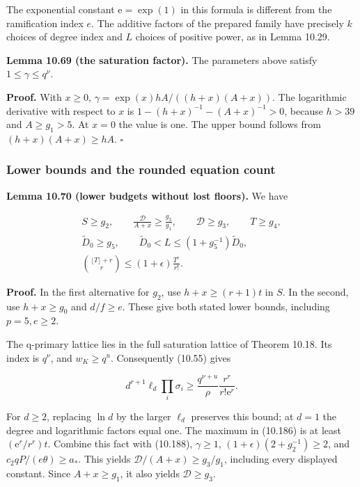 \documentclass[
  11pt,
  a4paper,
]{article}
\begin{document}
The exponential constant \(\mathrm e=\exp(1)\) in this formula is
different from the ramification index \(e\). The additive factors of the
prepared family have precisely \(k\) choices of degree index and \(L\)
choices of positive power, as in Lemma 10.29.

\textbf{Lemma 10.69 (the saturation factor).} The parameters above
satisfy \(1\le\gamma\le q^\nu\).

\textbf{Proof.} With \(x\ge0\), \(\gamma=\exp(x)hA/((h+x)(A+x))\). The
logarithmic derivative with respect to \(x\) is
\(1-(h+x)^{-1}-(A+x)^{-1}>0\), because \(h>39\) and \(A\ge g_1>5\). At
\(x=0\) the value is one. The upper bound follows from
\((h+x)(A+x)\ge hA\). \(\square\)

\subsubsection{Lower bounds and the rounded equation
count}\label{lower-bounds-and-the-rounded-equation-count}

\textbf{Lemma 10.70 (lower budgets without lost floors).} We have

\[
\begin{gathered}
S\ge g_2,\qquad
\frac{\mathcal D}{A+x}\ge\frac{g_3}{g_1},\qquad
\mathcal D\ge g_3,\qquad T\ge g_4,\\
\widetilde D_0\ge g_5,\qquad
\widetilde D_0<L\le(1+g_5^{-1})\widetilde D_0,\\
\binom{\lfloor T\rfloor+r}{r}
\le(1+\epsilon)\frac{T^r}{r!}.
\end{gathered}
\tag{10.187}
\]

\textbf{Proof.} In the first alternative for \(g_2\), use
\(h+x\ge(r+1)t\) in \(S\). In the second, use \(h+x\ge g_0\) and
\(d/f\ge e\). These give both stated lower bounds, including
\(p=5,e\ge2\).

The q-primary lattice lies in the full saturation lattice of Theorem
10.18. Its index is \(q^\nu\), and \(w_K\ge q^u\). Consequently (10.55)
gives

\[
d^{r+1}\ell_d\prod_i\sigma_i
\ge \frac{q^{\nu+u}}{\rho}\frac{r^r}{r!\mathrm e^r}.
\tag{10.188}
\]

For \(d\ge2\), replacing \(\ln d\) by the larger \(\ell_d\) preserves
this bound; at \(d=1\) the degree and logarithmic factors equal one. The
maximum in (10.186) is at least \((\mathrm e^r/r^r)t\). Combine this
fact with (10.188), \(\gamma\ge1\), \((1+\epsilon)(2+g_2^{-1})\ge2\),
and \(c_2qP/(e\theta)\ge a_*\). This yields
\(\mathcal D/(A+x)\ge g_3/g_1\), including every displayed constant.
Since \(A+x\ge g_1\), it also yields \(\mathcal D\ge g_3\).
\end{document}

